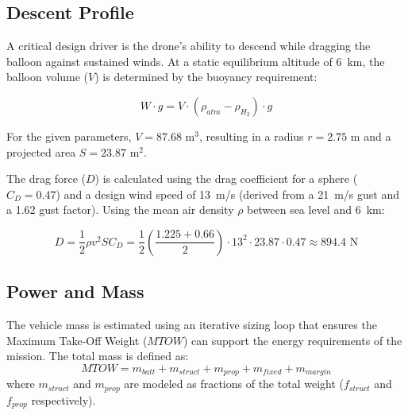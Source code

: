 \subsection*{Descent Profile}

A critical design driver is the drone's ability to descend while dragging the balloon against sustained winds. At a static equilibrium altitude of 6~km, the balloon volume ($V$) is determined by the buoyancy requirement:

\begin{equation}
    W \cdot g = V \cdot (\rho_{atm} - \rho_{H_2}) \cdot g
\end{equation}

For the given parameters, $V = 87.68\text{ m}^3$, resulting in a radius $r = 2.75\text{ m}$ and a projected area $S = 23.87\text{ m}^2$. 

The drag force ($D$) is calculated using the drag coefficient for a sphere ($C_D = 0.47$) and a design wind speed of 13~m/s (derived from a 21~m/s gust and a 1.62 gust factor). Using the mean air density $\rho$ between sea level and 6~km:

\begin{equation}
    D = \frac{1}{2} \rho v^2 S C_D = \frac{1}{2} \left( \frac{1.225 + 0.66}{2} \right) \cdot 13^2 \cdot 23.87 \cdot 0.47 \approx 894.4\text{ N}
\end{equation}


\subsection*{Power and Mass}
\label{sec:power_mass}

The vehicle mass is estimated using an iterative sizing loop that ensures the Maximum Take-Off Weight ($MTOW$) can support the energy requirements of the mission. The total mass is defined as:
\begin{equation}
    MTOW = m_{batt} + m_{struct} + m_{prop} + m_{fixed} + m_{margin}
\end{equation}
where $m_{struct}$ and $m_{prop}$ are modeled as fractions of the total weight ($f_{struct}$ and $f_{prop}$ respectively). 



